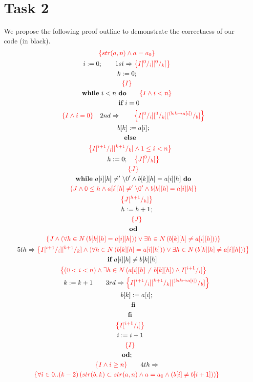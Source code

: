 \documentclass[a4paper,12pt,fleqn]{scrartcl}
\newcommand{\assn}[1]{{\color{red}\left\{#1\right\}}}
\begin{document}
\section{Task 2}
\label{sec:task-2}
We propose the following proof outline to demonstrate the correctness
of our code (in black).
\begin{gather*}
	\assn{{str(a,n)\And a}=a_0}\\
	i\Ass 0;\qquad 1st\Implies\assn{I\subst 0i\subst 0k}\\
	k\Ass 0;\\
	\assn{I}\\
	\WHILE~i<n~\DO \qquad\assn{I\And i<n}\\
	\quad \IF ~i=0~\\
	\qquad \assn{I\AND i=0}\quad 2nd \Implies	\qquad \assn{I\subst0i\subst0k\subst{(b:k\mapsto a[i])}b }\\
	\qquad b[k]\Ass a[i];\\
	\quad \ELSE\\
	\quad \assn{I\subst{i+1}i\subst{k+1}k \AND 1\leq i<n}\\
	\qquad h \Ass 0;\quad\assn {J\subst0h}\\
	\qquad\assn{J}\\
	\qquad \WHILE ~ a[i][h] \neq '\setminus0' \AND b[k][h] = a[i][h]~ \DO\\
	\qquad \assn{J \AND 0\leq h \AND a[i][h] \neq '\setminus0' \AND b[k][h] = a[i][h] }\\
	\qquad\quad \assn{J{\subst {h+1}h}}\\
\qquad\quad h \Ass h+1;\\
\qquad\quad \assn{J}\\
\qquad \OD\\
\qquad\assn {J \AND (\All{h\in N}{b[k][h]=a[i][h]}) \OR \Exi{h\in N}{b[k][h] \neq a[i][h]})}\\
\qquad 5th \Implies \assn {I\subst{i+1}i\subst{k+1}k \AND (\All{h\in N}{b[k][h]=a[i][h]}) \OR \Exi{h\in N}{b[k][h] \neq a[i][h]})}\\
\qquad \IF ~ a[i][h] \neq b[k][h]~ \\
\qquad \assn{(0<i<n) \AND \Exi{h\in N}{a[i][h] \neq b[k][h]}\AND I \subst{i+1}i}\\
\qquad\quad k\Ass k+1 \qquad 3rd \Implies\assn{I \subst{i+1}i\subst{k+1}k \subst{(b:k\mapsto a[i])}b }\\
\qquad\quad b[k]\Ass a[i];\\
\qquad \FI\\
\quad \FI\\
\quad \assn{I\subst{i+1}i}\\
\quad i\Ass i+1\\
\quad \assn{I}\\
\OD;\\
\assn{I\And i\geq n} \qquad 4th \Implies\\
\assn{\All{i\in 0..(k-2)} {str(b,k) \subset str(a,n) \AND a = a_0 \And (b[i] \neq b[i+1])}}
\end{gather*}
\end{document}
